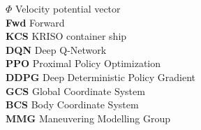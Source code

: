\abbreviations

\noindent\textbf{$\Phi$}   \> Velocity potential vector \\
\textbf{Fwd} \>  Forward\\
\textbf{KCS} \> KRISO container ship\\
\textbf{DQN} \>Deep Q-Network \\
\textbf{PPO} \> Proximal Policy Optimization \\
\textbf{DDPG} \> Deep Deterministic Policy Gradient \\
\textbf{GCS} \> Global Coordinate System \\
\textbf{BCS} \> Body Coordinate System \\
\textbf{MMG} \> Maneuvering Modelling Group \\